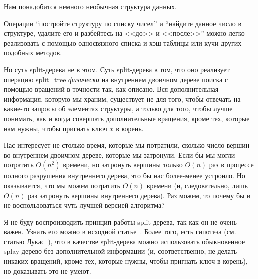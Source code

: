 Нам понадобится немного необычная структура данных.


\begin{remark} Операции ``постройте структуру по списку чисел'' и ``найдите данное число в структуре, удалите его и разбейтесь на <<до>> и <<после>>'' можно легко реализовать с помощью односвязного списка и хэш-таблицы или кучи других подобных методов.

Но суть split-дерева не в этом. Суть split-дерева в том, что оно реализует операцию \textrm{split\_tree} \emph{физически} на внутреннем двоичном дереве поиска с помощью вращений в точности так, как описано. Вся дополнительная информация, которую мы храним, существует не для того, чтобы отвечать на какие-то запросы об элементах структуры, а только для того, чтобы лучше понимать, как и когда совершать дополнительные вращения, кроме тех, которые нам нужны, чтобы пригнать ключ $x$ в корень.

Нас интересует не столько время, которые мы потратили, сколько число вершин во внутреннем двоичном дереве, которые мы затронули. Если бы мы могли потратить $O(n^2)$ времени, но затронуть вершины только $O(n)$ раз в процессе полного разрушения внутреннего дерева, это бы нас более-менее устроило. Но оказывается, что мы можем потратить $O(n)$ времени (и, следовательно, лишь $O(n)$ раз затронуть вершины внутреннего дерева). Раз можем, то почему бы и не воспользоваться чуть лучшей версией алгоритма?

Я не буду воспроизводить принцип работы split-дерева, так как он не очень важен. Узнать его можно в исходной статье~\cite{demaine2009geometry}. Более того, есть гипотеза (см. статью Лукас~\cite{lucas1988canonical}), что в качестве split-дерева можно использовать обыкновенное splay-дерево без дополнительной информации (и, соответственно, не делать никаких вращений, кроме тех, которые нужны, чтобы пригнать ключ в корень), но доказывать это не умеют.
\end{remark}

